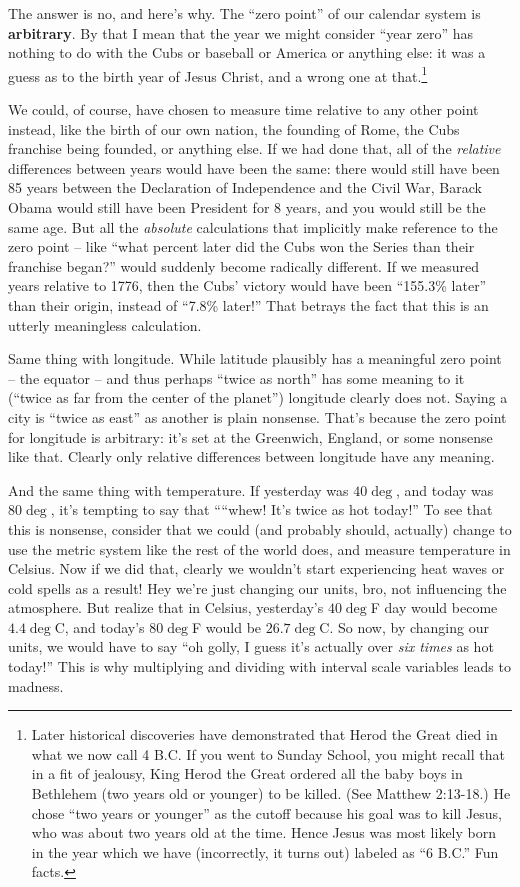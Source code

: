 The answer is no, and here's why. The ``zero point'' of our calendar system is
\textbf{arbitrary}. By that I mean that the year we might consider ``year
zero'' has nothing to do with the Cubs or baseball or America or anything else:
it was a guess as to the birth year of Jesus Christ, and a wrong one at
that.\footnote{Later historical discoveries have demonstrated that Herod the
Great died in what we now call 4 B.C. If you went to Sunday School, you might
recall that in a fit of jealousy, King Herod the Great ordered all the baby
boys in Bethlehem (two years old or younger) to be killed. (See Matthew
2:13-18.) He chose ``two years or younger'' as the cutoff because his goal was
to kill Jesus, who was about two years old at the time. Hence Jesus was most
likely born in the year which we have (incorrectly, it turns out) labeled as
``6 B.C.'' Fun facts.}

We could, of course, have chosen to measure time relative to any other point
instead, like the birth of our own nation, the founding of Rome, the Cubs
franchise being founded, or anything else. If we had done that, all of the
\textit{relative} differences between years would have been the same: there
would still have been 85 years between the Declaration of Independence and the
Civil War, Barack Obama would still have been President for 8 years, and you
would still be the same age. But all the \textit{absolute} calculations that
implicitly make reference to the zero point -- like ``what percent later did
the Cubs won the Series than their franchise began?'' would suddenly become
radically different. If we measured years relative to 1776, then the Cubs'
victory would have been ``155.3\% later'' than their origin, instead of ``7.8\%
later!'' That betrays the fact that this is an utterly meaningless calculation.

Same thing with longitude. While latitude plausibly has a meaningful zero point
-- the equator -- and thus perhaps ``twice as north'' has some meaning to it
(``twice as far from the center of the planet'') longitude clearly does not.
Saying a city is ``twice as east'' as another is plain nonsense. That's because
the zero point for longitude is arbitrary: it's set at the Greenwich, England,
or some nonsense like that. Clearly only relative differences between longitude
have any meaning.

And the same thing with temperature. If yesterday was $40\deg$, and today was
$80\deg$, it's tempting to say that ````whew! It's twice as hot today!'' To see
that this is nonsense, consider that we could (and probably should, actually)
change to use the metric system like the rest of the world does, and measure
temperature in Celsius. Now if we did that, clearly we wouldn't start
experiencing heat waves or cold spells as a result! Hey we're just changing our
units, bro, not influencing the atmosphere. But realize that in Celsius,
yesterday's $40\deg$F day would become $4.4\deg$C, and today's $80\deg$F would
be $26.7\deg$C. So now, by changing our units, we would have to say ``oh golly,
I guess it's actually over \textit{six times} as hot today!'' This is why
multiplying and dividing with interval scale variables leads to madness.



